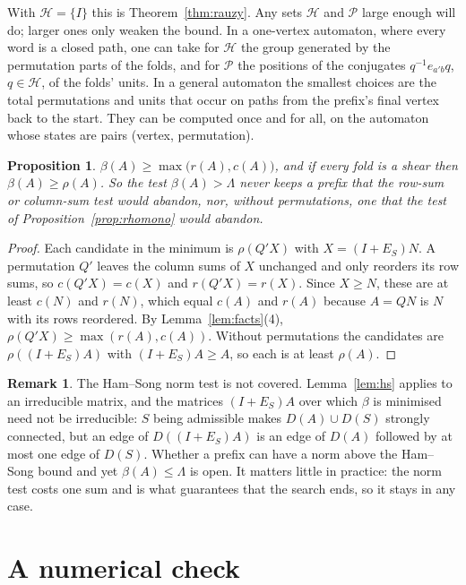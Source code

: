\documentclass[11pt]{amsart}
\newcommand{\Lam}{\Lambda}
\newcommand{\D}{D}
\newcommand{\Pos}{\mathcal{P}}
\newcommand{\Hgp}{\mathcal{H}}
\theoremstyle{plain}
\newtheorem{Proposition}[Theorem]{Proposition}
\theoremstyle{definition}
\newtheorem{Remark}[Theorem]{Remark}
\begin{document}
With $\Hgp=\{I\}$ this is Theorem~\ref{thm:rauzy}.  Any sets $\Hgp$ and
$\Pos$ large enough will do; larger ones only weaken the bound.  In a
one-vertex automaton, where every word is a closed path, one can take for
$\Hgp$ the group generated by the permutation parts of the folds, and for
$\Pos$ the positions of the conjugates $q^{-1}e_{a'b}q$, $q\in\Hgp$, of
the folds' units.  In a general automaton the smallest choices are the
total permutations and units that occur on paths from the prefix's final
vertex back to the start.  They can be computed once and for all, on the
automaton whose states are pairs (vertex, permutation).

\begin{Proposition}
  \label{prop:dominate}
  $\beta(A)\ge\max\bigl(r(A),c(A)\bigr)$, and if every fold is a shear then
  $\beta(A)\ge\rho(A)$.  So the test $\beta(A)>\Lam$ never keeps a prefix
  that the row-sum or column-sum test would abandon, nor, without
  permutations, one that the test of Proposition~\ref{prop:rhomono} would
  abandon.
\end{Proposition}

\begin{proof}
  Each candidate in the minimum is $\rho(Q'X)$ with $X=(I+E_S)N$.  A
  permutation $Q'$ leaves the column sums of $X$ unchanged and only
  reorders its row sums, so $c(Q'X)=c(X)$ and $r(Q'X)=r(X)$.  Since
  $X\ge N$, these are at least $c(N)$ and $r(N)$, which equal $c(A)$ and
  $r(A)$ because $A=QN$ is $N$ with its rows reordered.  By
  Lemma~\ref{lem:facts}(4), $\rho(Q'X)\ge\max(r(A),c(A))$.  Without
  permutations the candidates are $\rho((I+E_S)A)$ with $(I+E_S)A\ge A$,
  so each is at least $\rho(A)$.
\end{proof}

\begin{Remark}
  \label{rem:norm}
  The Ham--Song norm test is not covered.  Lemma~\ref{lem:hs} applies to an
  irreducible matrix, and the matrices $(I+E_S)A$ over which $\beta$ is
  minimised need not be irreducible: $S$ being admissible makes
  $\D(A)\cup\D(S)$ strongly connected, but an edge of $\D((I+E_S)A)$ is an
  edge of $\D(A)$ followed by at most one edge of $\D(S)$.  Whether a
  prefix can have a norm above the Ham--Song bound and yet
  $\beta(A)\le\Lam$ is open.  It matters little in practice: the norm test
  costs one sum and is what guarantees that the search ends, so it stays in
  any case.
\end{Remark}

\section{A numerical check}
\label{sec:check}
\end{document}
